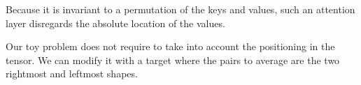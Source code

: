 \documentclass[c,8pt]{beamer}
\begin{document}
\begin{frame}

\begin{warning}
Because it is invariant to a permutation of the keys and values, such
an attention layer disregards the absolute location of the values.
\end{warning}













Our toy problem does not require to take into account the positioning
in the tensor. We can modify it with a target where the pairs to
average are the two rightmost and leftmost shapes.

\vspace*{4ex}

\end{frame}
\end{document}
